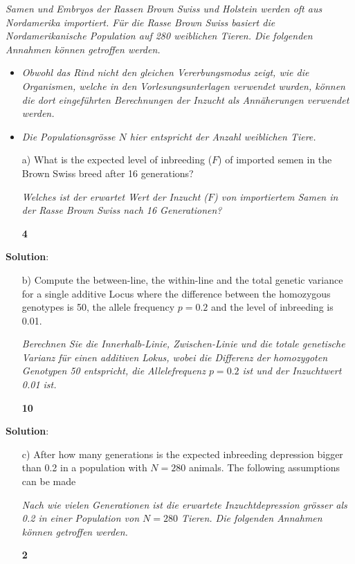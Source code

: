 \documentclass[
]{article}
\providecommand{\tightlist}{%
  \setlength{\itemsep}{0pt}\setlength{\parskip}{0pt}}
\newcommand{\points}[1]
{\begin{flushright}\textbf{#1}\end{flushright}}
\newcommand{\solstart}
{\vspace{3ex}\textbf{Solution}:}
\begin{document}
\textit{Samen und Embryos der Rassen Brown Swiss und Holstein werden oft aus Nordamerika importiert. Für die Rasse Brown Swiss basiert die Nordamerikanische Population auf 280 weiblichen Tieren. Die folgenden Annahmen können getroffen werden.}

\begin{itemize}
\tightlist
\item
  \textit{Obwohl das Rind nicht den gleichen Vererbungsmodus zeigt, wie die Organismen, welche in den Vorlesungsunterlagen verwendet wurden, können die dort eingeführten Berechnungen der Inzucht als Annäherungen verwendet werden.}
\item
  \textit{Die Populationsgrösse $N$ hier entspricht der Anzahl weiblichen Tiere.}
\end{itemize}

\vspace{3ex}
\begin{enumerate}
\item[a)] What is the expected level of inbreeding ($F$) of imported semen in the Brown Swiss breed after 16 generations?

\textit{Welches ist der erwartet Wert der Inzucht ($F$) von importiertem Samen in der Rasse Brown Swiss nach 16 Generationen?}
\points{4}
\end{enumerate}

\solstart

\clearpage
\pagebreak

\begin{enumerate}
\item[b)] Compute the between-line, the within-line and the total genetic variance for a single additive Locus where the difference between the homozygous genotypes is 50, the allele frequency $p = 0.2$ and the level of inbreeding is 0.01. 

\textit{Berechnen Sie die Innerhalb-Linie, Zwischen-Linie und die totale genetische Varianz für einen additiven Lokus, wobei die Differenz der homozygoten Genotypen 50 entspricht, die Allelefrequenz $p = 0.2$ ist und der Inzuchtwert 0.01 ist.}
\points{10}
\end{enumerate}

\solstart

\clearpage
\pagebreak

\begin{enumerate}
\item[c)] After how many generations is the expected inbreeding depression bigger than 0.2 in a population with $N = 280$ animals. The following assumptions can be made

\textit{Nach wie vielen Generationen ist die erwartete Inzuchtdepression grösser als 0.2 in einer Population von $N = 280$ Tieren. Die folgenden Annahmen können getroffen werden.}
\points{2}
\end{enumerate}
\end{document}
